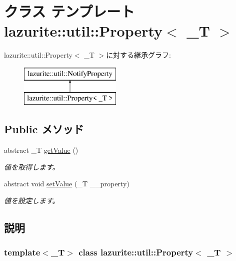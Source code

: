 \hypertarget{classlazurite_1_1util_1_1_property_3_01___t_01_4}{
\section{クラス テンプレート lazurite::util::Property$<$ \_\-T $>$}
\label{classlazurite_1_1util_1_1_property_3_01___t_01_4}
}
lazurite::util::Property$<$ \_\-T $>$に対する継承グラフ:\begin{figure}[H]
\begin{center}
\leavevmode
\includegraphics[height=2cm]{classlazurite_1_1util_1_1_property_3_01___t_01_4}
\end{center}
\end{figure}
\subsection*{Public メソッド}
\begin{DoxyCompactItemize}
\item 
abstract \_\-T \hyperlink{classlazurite_1_1util_1_1_property_3_01___t_01_4_a434077d787020d0b4f9754713495f0b0}{getValue} ()
\begin{DoxyCompactList}\small\item\em 値を取得します。 \item\end{DoxyCompactList}\item 
abstract void \hyperlink{classlazurite_1_1util_1_1_property_3_01___t_01_4_a3f1f7cb7df540b368296433279caae71}{setValue} (\_\-T \_\-\_\-property)
\begin{DoxyCompactList}\small\item\em 値を設定します。 \item\end{DoxyCompactList}\end{DoxyCompactItemize}


\subsection{説明}
\subsubsection*{template$<$\_\-T$>$ class lazurite::util::Property$<$ \_\-T $>$}


